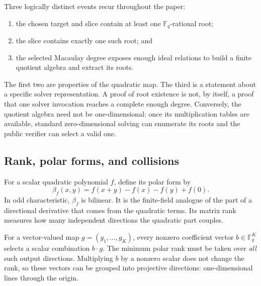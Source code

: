 \documentclass[11pt]{article}
\newcommand{\F}{\mathbb F}
\begin{document}
Three logically distinct events recur throughout the paper:
\begin{enumerate}[label=(\roman*),itemsep=2pt]
\item the chosen target and slice contain at least one $\F_q$-rational root;
\item the slice contains exactly one such root; and
\item the selected Macaulay degree exposes enough ideal relations to build a
      finite quotient algebra and extract its roots.
\end{enumerate}
The first two are properties of the quadratic map.  The third is a statement
about a specific solver representation.  A proof of root existence is not, by
itself, a proof that one solver invocation reaches a complete enough degree.
Conversely, the quotient algebra need not be one-dimensional: once its
multiplication tables are available, standard zero-dimensional solving can
enumerate its roots and the public verifier can select a valid one.

\subsection{Rank, polar forms, and collisions}

For a scalar quadratic polynomial $f$, define its polar form by
\[
  \beta_f(x,y)=f(x+y)-f(x)-f(y)+f(0).
\]
In odd characteristic, $\beta_f$ is bilinear.  It is the finite-field analogue
of the part of a directional derivative that comes from the quadratic terms.
Its matrix rank measures how many independent directions the quadratic part
couples.

For a vector-valued map $g=(g_1,\ldots,g_K)$, every nonzero coefficient vector
$b\in\F_q^K$ selects a scalar combination $b\cdot g$.  The minimum polar rank
must be taken over \emph{all} such output directions.  Multiplying $b$ by a nonzero scalar does not change the rank, so these
vectors can be grouped into projective directions: one-dimensional lines
through the origin.
\end{document}
